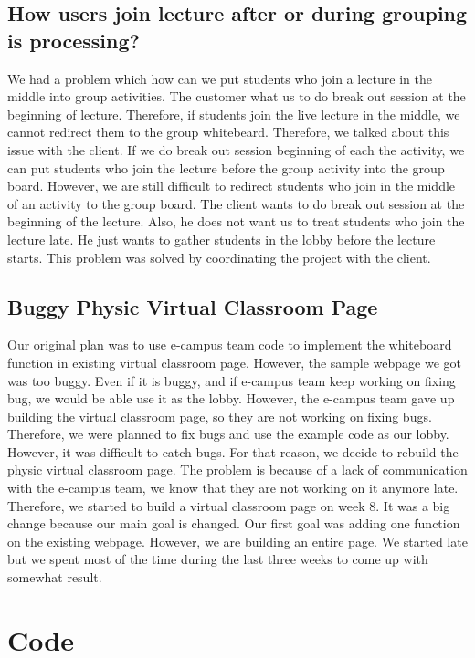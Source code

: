 \documentclass[10pt, letterpaper]{article}
\begin{document}
    \subsection{How users join lecture after or during grouping is processing?}
        We had a problem which how can we put students who join a lecture in the middle into group activities. The customer what us to do break out session at the beginning of lecture. Therefore, if students join the live lecture in the middle, we cannot redirect them to the group whitebeard. Therefore, we talked about this issue with the client. If we do break out session beginning of each the activity, we can put students who join the lecture before the group activity into the group board. However, we are still difficult to redirect students who join in the middle of an activity to the group board. The client wants to do break out session at the beginning of the lecture. Also, he does not want us to treat students who join the lecture late. He just wants to gather students in the lobby before the lecture starts. This problem was solved by coordinating the project with the client. 
        
    \subsection{Buggy Physic Virtual Classroom Page}
        Our original plan was to use e-campus team code to implement the whiteboard function in existing virtual classroom page. However, the sample webpage we got was too buggy. Even if it is buggy, and if e-campus team keep working on fixing bug, we would be able use it as the lobby. However, the e-campus team gave up building the virtual classroom page, so they are not working on fixing bugs. Therefore, we were planned to fix bugs and use the example code as our lobby. However, it was difficult to catch bugs. For that reason, we decide to rebuild the physic virtual classroom page. The problem is because of a lack of communication with the e-campus team, we know that they are not working on it anymore late. Therefore, we started to build a virtual classroom page on week 8. It was a big change because our main goal is changed. Our first goal was adding one function on the existing webpage. However, we are building an entire page. We started late but we spent most of the time during the last three weeks to come up with somewhat result.

\newpage
\section{Code}
\end{document}
